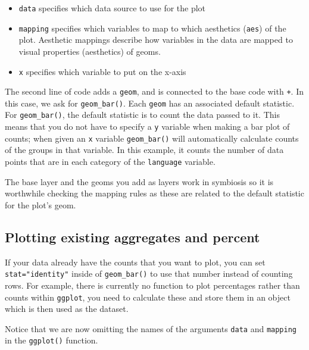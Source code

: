 \documentclass[
  english,
  doc,floatsintext]{apa6}
\begin{document}
\begin{itemize}
\item
  \texttt{data} specifies which data source to use for the plot
\item
  \texttt{mapping} specifies which variables to map to which aesthetics (\texttt{aes}) of the plot. Aesthetic mappings describe how variables in the data are mapped to visual properties (aesthetics) of geoms.
\item
  \texttt{x} specifies which variable to put on the x-axis
\end{itemize}

The second line of code adds a \texttt{geom}, and is connected to the base code with \texttt{+}. In this case, we ask for \texttt{geom\_bar()}. Each \texttt{geom} has an associated default statistic. For \texttt{geom\_bar()}, the default statistic is to count the data passed to it. This means that you do not have to specify a \texttt{y} variable when making a bar plot of counts; when given an \texttt{x} variable \texttt{geom\_bar()} will automatically calculate counts of the groups in that variable. In this example, it counts the number of data points that are in each category of the \texttt{language} variable.

The base layer and the geoms you add as layers work in symbiosis so it is worthwhile checking the mapping rules as these are related to the default statistic for the plot's geom.

\hypertarget{plotting-existing-aggregates-and-percent}{%
\subsection{Plotting existing aggregates and percent}\label{plotting-existing-aggregates-and-percent}}

If your data already have the counts that you want to plot, you can set \texttt{stat="identity"} inside of \texttt{geom\_bar()} to use that number instead of counting rows. For example, there is currently no function to plot percentages rather than counts within \texttt{ggplot}, you need to calculate these and store them in an object which is then used as the dataset.

Notice that we are now omitting the names of the arguments \texttt{data} and \texttt{mapping} in the \texttt{ggplot()} function.
\end{document}
